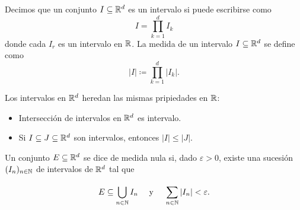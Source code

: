 	\begin{definition}
		Decimos que un conjunto $I\subseteq\mathbb{R}^d$ es un intervalo si puede escribirse como
		\[
		I=\prod_{k=1}^{d} I_k
		\]
		donde cada $I_r$ es un intervalo en $\mathbb{R}$. La medida de un intervalo $I\subseteq\mathbb{R}^d$ se define como
		\[
		|I|\coloneq\prod_{k=1}^{d} |I_k|.
		\]
	\end{definition}

	\begin{note}
		Los intervalos en $\mathbb{R}^d$ heredan las mismas pripiedades en $\mathbb{R}$:

		\begin{itemize}
			\item Intersección de intervalos en $\mathbb{R}^d$ es intervalo.

			\item Si $I\subseteq J\subseteq\mathbb{R}^d$ son intervalos, entonces $|I|\leq|J|$.
		\end{itemize}
	\end{note}

	\begin{definition}
		Un conjunto $E\subseteq\mathbb{R}^d$ se dice de medida nula si, dado $\varepsilon>0$, existe una sucesión $(I_n)_{n\in\mathbb{N}}$ de intervalos de $\mathbb{R}^d$ tal que

		\[
		E\subseteq\bigcup_{n\in\mathbb{N}} I_n\quad\text{ y }\quad \sum_{n\in\mathbb{N}}^{}|I_n|<\varepsilon.
		\]
	\end{definition}


